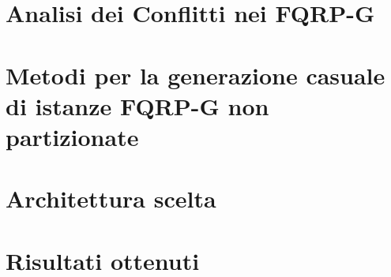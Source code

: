 \section{Analisi dei Conflitti nei FQRP-G}


\section{Metodi per la generazione casuale di istanze FQRP-G non partizionate}


\section{Architettura scelta}


\section{Risultati ottenuti}


